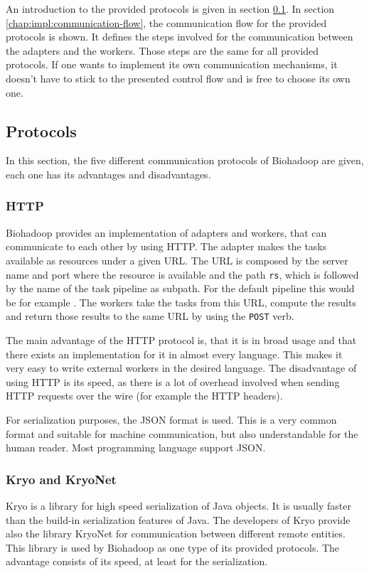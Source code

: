   An introduction to the provided protocols is given in section \ref{chap:impl:protocols}. In section \ref{chap:impl:communication-flow}, the communication flow for the provided protocols is shown. It defines the steps involved for the communication between the adapters and the workers. Those steps are the same for all provided protocols. If one wants to implement its own communication mechanisms, it doesn't have to stick to the presented control flow and is free to choose its own one.
  
  \subsection{Protocols}
  \label{chap:impl:protocols}
    In this section, the five different communication protocols of Biohadoop are given, each one has its advantages and disadvantages.

    \subsubsection{HTTP}
      Biohadoop provides an implementation of adapters and workers, that can communicate to each other by using HTTP. The adapter makes the tasks available as resources under a given URL. The URL is composed by the server name and port where the resource is available and the path \texttt{rs}, which is followed by the name of the task pipeline as subpath. For the default pipeline this would be for example . The workers take the tasks from this URL, compute the results and return those results to the same URL by using the \texttt{POST} verb.
      
      The main advantage of the HTTP protocol is, that it is in broad usage and that there exists an implementation for it in almost every language. This makes it very easy to write external workers in the desired language. The disadvantage of using HTTP is its speed, as there is a lot of overhead involved when sending HTTP requests over the wire (for example the HTTP headers).

      For serialization purposes, the JSON format is used. This is a very common format and suitable for machine communication, but also understandable for the human reader. Most programming language support JSON.
    \subsubsection{Kryo and KryoNet}
      Kryo \cite{kryo} is a library for high speed serialization of Java objects. It is usually faster than the build-in serialization features of Java. The developers of Kryo provide also the library KryoNet \cite{kryonet} for communication between different remote entities. This library is used by Biohadoop as one type of its provided protocols. The advantage consists of its speed, at least for the serialization.
      
